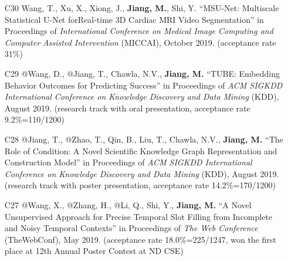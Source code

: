 \documentclass[10pt]{article}
\newenvironment{myindentpar}[1]%
{\begin{list}{}%
         {\setlength{\leftmargin}{#1}}%
         \item[]%
}
{\end{list}}
\newcounter{list}
\newcommand{\hide}[1]{}
\begin{document}
\begin{myindentpar}{0.00cm}
\begin{enumerate}[leftmargin=.5cm]
\item[C30] Wang, T., Xu, X., Xiong, J., \textbf{Jiang, M.}, Shi, Y. ``MSU-Net: Multiscale Statistical U-Net forReal-time 3D Cardiac MRI Video Segmentation'' in Proceedings of \textit{International Conference on Medical Image Computing and Computer Assisted Intervention} (MICCAI), October 2019. (acceptance rate 31\%)		
	\hide{\vspace{-0.1cm}\hspace{0.5cm}{\small \emph{I made 5\% contribution. I joined the discussions, re-wrote the introduction section, and reviewed the rest of the paper.}}}

\item[C29] @Wang, D., @Jiang, T., Chawla, N.V., \textbf{Jiang, M.} ``TUBE: Embedding Behavior Outcomes for Predicting Success'' in Proceedings of \emph{ACM SIGKDD International Conference on Knowledge Discovery and Data Mining} (KDD), August 2019. (research track with oral presentation, acceptance rate 9.2\%=110/1200)

	\hide{\vspace{-0.1cm}\hspace{0.5cm}{\small \emph{I made 30\% contribution and Mr. Wang made 60\%. I conceived the idea. Mr. Wang designed the study, implemented the system, and did the experiments. I wrote the introduction and part of method sections. Mr. Wang wrote the rest of the paper.}}}

\item[C28] @Jiang, T., @Zhao, T., Qin, B., Liu, T., Chawla, N.V., \textbf{Jiang, M.} ``The Role of Condition: A Novel Scientific Knowledge Graph Representation and Construction Model'' in Proceedings of \emph{ACM SIGKDD International Conference on Knowledge Discovery and Data Mining} (KDD), August 2019. (research track with poster presentation, acceptance rate 14.2\%=170/1200)

	\hide{\vspace{-0.1cm}\hspace{0.5cm}{\small \emph{I made 30\% contribution and Mr. Jiang made 60\%. I conceived the idea. Mr. Jiang designed the study, implemented the system, and did the experiments. I wrote the introduction. Mr. Jiang wrote the rest of the paper.}}}

\item[C27] @Wang, X., @Zhang, H., @Li, Q., Shi, Y., \textbf{Jiang, M.} ``A Novel Unsupervised Approach for Precise Temporal Slot Filling from Incomplete and Noisy Temporal Contexts'' in Proceedings of \emph{The Web Conference} (TheWebConf), May 2019. (acceptance rate 18.0\%=225/1247, won the first place at 12th Annual Poster Contest at ND CSE)


\end{enumerate}
\end{myindentpar}
\end{document}
